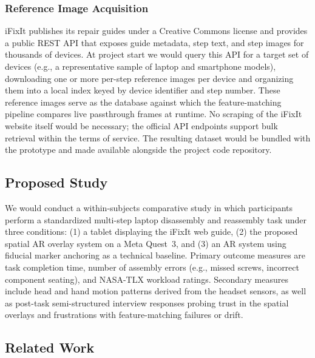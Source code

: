 \documentclass{styling/vgtc}                          %
\begin{document}
\subsubsection{Reference Image Acquisition}
iFixIt publishes its repair guides under a Creative Commons license and provides a
public REST API that exposes guide metadata, step text, and step images for thousands
of devices. At project start we would query this API for a target set of devices
(e.g., a representative sample of laptop and smartphone models), downloading one or
more per-step reference images per device and organizing them into a local index keyed
by device identifier and step number. These reference images serve as the database
against which the feature-matching pipeline compares live passthrough frames at
runtime. No scraping of the iFixIt website itself would be necessary; the official API
endpoints support bulk retrieval within the terms of service. The resulting dataset would
be bundled with the prototype and made available alongside the project code repository.

\subsection{Proposed Study}

We would conduct a within-subjects comparative study in which
participants perform a standardized multi-step laptop disassembly and
reassembly task under three conditions: (1) a tablet displaying the iFixIt
web guide, (2) the proposed spatial AR overlay system on a Meta Quest~3, and
(3) an AR system using fiducial marker anchoring as a technical baseline.
Primary outcome measures are task completion time, number of assembly errors
(e.g., missed screws, incorrect component seating), and NASA-TLX workload
ratings. Secondary measures include head and hand motion patterns derived from
the headset sensors, as well as post-task semi-structured interview responses
probing trust in the spatial overlays and frustrations with feature-matching
failures or drift.

\subsection{Related Work}
\end{document}
